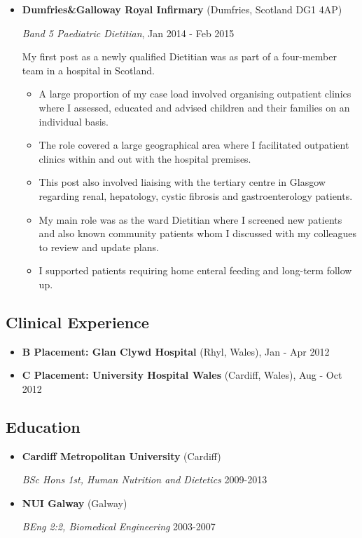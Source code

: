 \documentclass[]{article}
\providecommand{\tightlist}{%
  \setlength{\itemsep}{0pt}\setlength{\parskip}{0pt}}
\begin{document}
\begin{itemize}
\item
  \textbf{Dumfries\&Galloway Royal Infirmary} (Dumfries, Scotland DG1
  4AP)

  \emph{Band 5 Paediatric Dietitian}, Jan 2014 - Feb 2015

  My first post as a newly qualified Dietitian was as part of a
  four-member team in a hospital in Scotland.

  \begin{itemize}
  \tightlist
  \item
    A large proportion of my case load involved organising outpatient
    clinics where I assessed, educated and advised children and their
    families on an individual basis.
  \item
    The role covered a large geographical area where I facilitated
    outpatient clinics within and out with the hospital premises.
  \item
    This post also involved liaising with the tertiary centre in Glasgow
    regarding renal, hepatology, cystic fibrosis and gastroenterology
    patients.
  \item
    My main role was as the ward Dietitian where I screened new patients
    and also known community patients whom I discussed with my
    colleagues to review and update plans.
  \item
    I supported patients requiring home enteral feeding and long-term
    follow up.
  \end{itemize}
\end{itemize}

\subsection{Clinical Experience}\label{clinical-experience}

\begin{itemize}
\item
  \textbf{B Placement: Glan Clywd Hospital} (Rhyl, Wales), Jan - Apr
  2012
\item
  \textbf{C Placement: University Hospital Wales} (Cardiff, Wales), Aug
  - Oct 2012
\end{itemize}

\subsection{Education}\label{education}

\begin{itemize}
\item
  \textbf{Cardiff Metropolitan University} (Cardiff)

  \emph{BSc Hons 1st, Human Nutrition and Dietetics} 2009-2013
\item
  \textbf{NUI Galway} (Galway)

  \emph{BEng 2:2, Biomedical Engineering} 2003-2007
\end{itemize}
\end{document}
